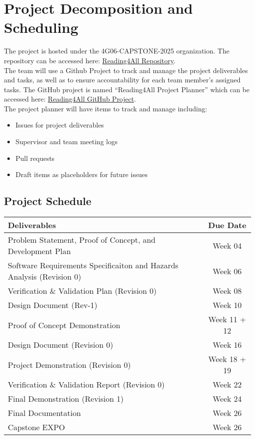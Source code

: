 \documentclass{article}
\begin{document}
\section{Project Decomposition and Scheduling}

The project is hosted under the 4G06-CAPSTONE-2025 organization. The repository can be 
accessed here: \href{https://github.com/4G06-CAPSTONE-2025/Reading4All}{Reading4All Repository}. \\[1ex]
The team will use a Github Project to track and manage the project deliverables and tasks, as well 
as to ensure accountability for each team member's assigned tasks. The GitHub 
project is named ``Reading4All Project Planner'' which can be accessed here: 
\href{https://github.com/orgs/4G06-CAPSTONE-2025/projects/4}{Reading4All GitHub Project}. \\[1ex]
The project planner will have items to track and manage including:
\begin{itemize}
  \item Issues for project deliverables
  \item Supervisor and team meeting logs 
  \item Pull requests 
  \item Draft items as placeholders for future issues
\end{itemize}
\subsection{Project Schedule}
\begin{center}
  \begin{tabularx}{\textwidth}{Xc}
    \toprule
    \textbf{Deliverables} & \textbf{Due Date} \\
    \midrule
    Problem Statement, Proof of Concept, and Development Plan & Week  04 \\
    Software Requirements Specificaiton and Hazards Analysis (Revision 0) & Week 06 \\
    Verification \& Validation Plan (Revision 0) & Week 08 \\
    Design Document (Rev-1) & Week 10 \\
    Proof of Concept Demonstration & Week 11 + 12 \\
    Design Document (Revision 0) & Week 16 \\
    Project Demonstration (Revision 0) & Week 18 + 19 \\
    Verification \& Validation Report (Revision 0) & Week 22 \\
    Final Demonstration (Revision 1) & Week 24 \\
    Final Documentation & Week 26 \\
    Capstone EXPO & Week 26 \\
    \bottomrule
  \end{tabularx}
\end{center}
\end{document}
